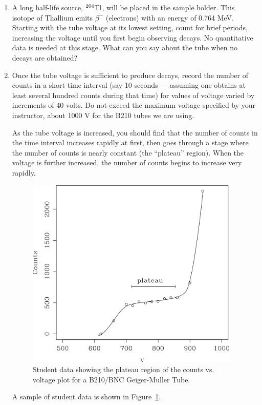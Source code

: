\begin{enumerate}
\item A long half-life source, ${}^{204}{\rm Tl}$, will be placed in the sample
holder.  This isotope of Thallium emits $\beta^-$ (electrons) with an energy of 0.764 MeV.  Starting with the tube voltage at its lowest setting, count
for brief periods, increasing the voltage until you first begin
observing decays.  No quantitative data is needed at this stage.
What can you say about the tube when no decays are obtained?

\item Once the tube voltage is sufficient to produce decays, record the
number of counts in a short time interval (say 10 seconds --- assuming one obtains at least
several hundred counts during that time) for values of voltage varied
by increments of 40 volts.  Do not exceed the maximum voltage
specified by your instructor, about 1000 V for the B210 tubes we are using.

As the tube voltage is increased, you should find that the number of
counts in the time interval increases rapidly at first, then goes
through a stage where the number of counts is nearly constant (the
``plateau'' region).  When the voltage is
further increased, the number of counts begins to increase very
rapidly.
\begin{figure}
\begin{centering}
\includegraphics[width=4in]{../images/gmplateau.png}
\caption{Student data showing the plateau region of the counts vs. voltage plot for a B210/BNC Geiger-Muller Tube.}
\label{fig:rate-V}
\end{centering}
\end{figure}
A sample of student data is shown in Figure~\ref{fig:rate-V}.


\end{enumerate}
